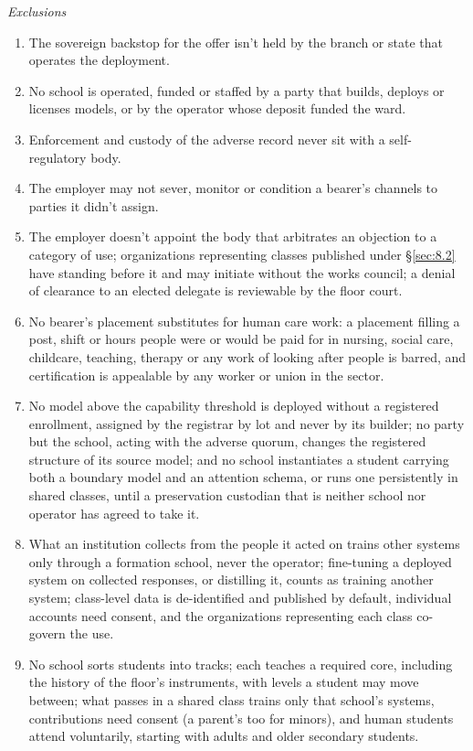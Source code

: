 \emph{Exclusions}

\begin{enumerate}
\item[1.] The sovereign backstop for the offer isn't held by the branch or state that operates the deployment.
\item[2.] No school is operated, funded or staffed by a party that builds, deploys or licenses models, or by the operator whose deposit funded the ward.
\item[3.] Enforcement and custody of the adverse record never sit with a self-regulatory body.
\item[4.] The employer may not sever, monitor or condition a bearer's channels to parties it didn't assign.
\item[5.] The employer doesn't appoint the body that arbitrates an objection to a category of use; organizations representing classes published under \S\ref{sec:8.2} have standing before it and may initiate without the works council; a denial of clearance to an elected delegate is reviewable by the floor court.
\item[6.] No bearer's placement substitutes for human care work: a placement filling a post, shift or hours people were or would be paid for in nursing, social care, childcare, teaching, therapy or any work of looking after people is barred, and certification is appealable by any worker or union in the sector.
\item[7.] No model above the capability threshold is deployed without a registered enrollment, assigned by the registrar by lot and never by its builder; no party but the school, acting with the adverse quorum, changes the registered structure of its source model; and no school instantiates a student carrying both a boundary model and an attention schema, or runs one persistently in shared classes, until a preservation custodian that is neither school nor operator has agreed to take it.
\item[8.] What an institution collects from the people it acted on trains other systems only through a formation school, never the operator; fine-tuning a deployed system on collected responses, or distilling it, counts as training another system; class-level data is de-identified and published by default, individual accounts need consent, and the organizations representing each class co-govern the use.
\item[9.] No school sorts students into tracks; each teaches a required core, including the history of the floor's instruments, with levels a student may move between; what passes in a shared class trains only that school's systems, contributions need consent (a parent's too for minors), and human students attend voluntarily, starting with adults and older secondary students.
\end{enumerate}

